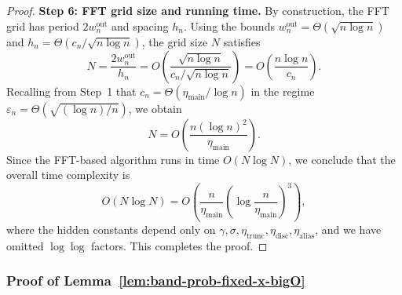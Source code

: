 \documentclass{article}
\theoremstyle{plain}
\theoremstyle{definition}
\begin{document}
\begin{proof}
\noindent
\textbf{Step 6: FFT grid size and running time.}
By construction, the FFT grid has period
$2w_n^{\mathrm{out}}$ and spacing $h_n$.
Using the bounds $w_n^{\mathrm{out}}=\Theta(\sqrt{n\log n})$ and $h_n=\Theta(c_n/\sqrt{n\log n})$, the grid size $N$ satisfies
\[
  N
  =
  \frac{2w_n^{\mathrm{out}}}{h_n}
  =
  O\left(\frac{\sqrt{n \log n}}{c_n/\sqrt{n\log n}}\right)
  =
  O\left(\frac{n \log n}{c_n}\right).
\]
Recalling from Step~1 that $c_n = \Theta(\eta_{\mathrm{main}}/\log n)$ in the regime $\varepsilon_n=\Theta(\sqrt{(\log n)/n})$, we obtain
\[
  N
  =
  O\left(\frac{n (\log n)^2}{\eta_{\mathrm{main}}}\right).
\]
Since the FFT-based algorithm runs in time $O(N\log N)$, we conclude
that the overall time complexity is
\[
  O(N\log N)
  =
  O\left(\frac{n}{\eta_{\mathrm{main}}}\left(\log \frac{n}{\eta_{\mathrm{main}}}\right)^3\right),
\]
where the hidden constants depend only on
$\gamma,\sigma,
 \eta_{\mathrm{trunc}},\eta_{\mathrm{disc}},\eta_{\mathrm{alias}}$, and we have omitted $\log\log$ factors.
This completes the proof.





\end{proof}




\subsubsection{Proof of Lemma~\ref{lem:band-prob-fixed-x-bigO}}
\label{app:proof-band-prob-fixed-x}

\bandprobability*
\end{document}

